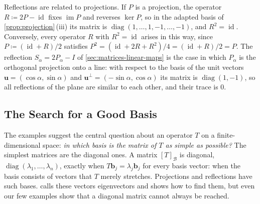 Reflections are related to projections. If $P$ is a projection, the operator $R\coloneqq2P-\operatorname{id}$ fixes $\operatorname{im}P$ and reverses $\ker P$, so in the adapted basis of \cref{prop:projection}\,(iii) its matrix is $\operatorname{diag}(1,\ldots,1,-1,\ldots,-1)$, and $R^2=\operatorname{id}$. Conversely, every operator $R$ with $R^2=\operatorname{id}$ arises in this way, since $P\coloneqq(\operatorname{id}+R)/2$ satisfies $P^2=(\operatorname{id}+2R+R^2)/4=(\operatorname{id}+R)/2=P$. The reflection $S_\alpha=2P_\alpha-I$ of \cref{sec:matrices-linear-maps} is the case in which $P_\alpha$ is the orthogonal projection onto a line: with respect to the basis of the unit vectors $\mathbf u=(\cos\alpha,\sin\alpha)$ and $\mathbf u^\perp=(-\sin\alpha,\cos\alpha)$ its matrix is $\operatorname{diag}(1,-1)$, so all reflections of the plane are similar to each other, and their trace is $0$.

\subsection{The Search for a Good Basis}

The examples suggest the central question about an operator $T$ on a finite-dimensional space: \emph{in which basis is the matrix of $T$ as simple as possible?} The simplest matrices are the diagonal ones. A matrix $[T]_{\mathcal B}$ is diagonal, $\operatorname{diag}(\lambda_1,\ldots,\lambda_n)$, exactly when $T\mathbf b_j=\lambda_j\mathbf b_j$ for every basis vector: when the basis consists of vectors that $T$ merely stretches. Projections and reflections have such bases.  calls these vectors eigenvectors and shows how to find them, but even our few examples show that a diagonal matrix cannot always be reached.

